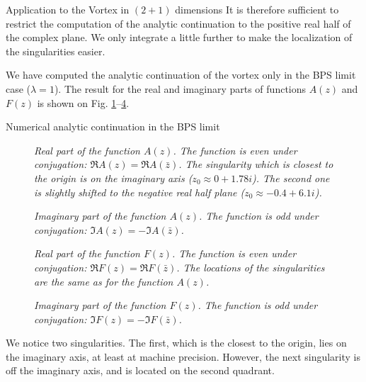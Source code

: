 \begin{section}{Application to the Vortex in $(2+1)$ dimensions}
  It is therefore sufficient to restrict the computation of the
  analytic continuation to the positive real half of the complex
  plane. We only integrate a little further to make the localization
  of the singularities easier.

  We have computed the analytic continuation of the vortex only in
  the BPS limit case ($\lambda = 1$). The result for the real and
  imaginary parts of functions $A(z)$ and $F(z)$ is shown on
  Fig. \ref{fig:cm_vortex_a_real}--\ref{fig:cm_vortex_f_imag}.
  \begin{subsection}{Numerical analytic continuation in the BPS limit}
    \begin{figure}[!ht]
      \begin{center}
        
        \caption{\em Real part of the function $A(z)$. The function is
          even under conjugation: $\Re A(z) = \Re A(\bar z)$. The
          singularity which is closest to the origin is on the
          imaginary axis ($z_0 \approx 0+1.78i$). The second one is
          slightly shifted to the negative real half plane
          ($z_0\approx -0.4+6.1i$). }
        \label{fig:cm_vortex_a_real}
      \end{center}
    \end{figure}

    \begin{figure}[!ht]
      \begin{center}
        
        \caption{\em Imaginary part of the function $A(z)$. The function is
          odd under conjugation: $\Im A(z) = -\Im A(\bar z)$.}
        \label{fig:cm_vortex_a_imag}
      \end{center}
    \end{figure}

    \begin{figure}[!ht]
      \begin{center}
        
        \caption{\em Real part of the function $F(z)$. The function is
          even under conjugation: $\Re F(z) = \Re F(\bar z)$. The
          locations of the singularities are the same as for the
          function $A(z)$.}
        \label{fig:cm_vortex_f_real}
      \end{center}
    \end{figure}

    \begin{figure}[!ht]
      \begin{center}
        
        \caption{\em Imaginary part of the function $F(z)$. The function is
          odd under conjugation: $\Im F(z) = -\Im F(\bar z)$.}
        \label{fig:cm_vortex_f_imag}
      \end{center}
    \end{figure}
    We notice two singularities. The first, which is the closest to
    the origin, lies on the imaginary axis, at least at machine
    precision. However, the next singularity is off the imaginary
    axis, and is located on the second quadrant.


\end{subsection}
\end{section}
